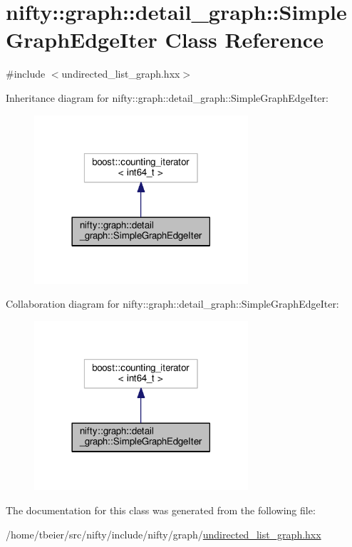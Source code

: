 \hypertarget{classnifty_1_1graph_1_1detail__graph_1_1SimpleGraphEdgeIter}{}\section{nifty\+:\+:graph\+:\+:detail\+\_\+graph\+:\+:Simple\+Graph\+Edge\+Iter Class Reference}
\label{classnifty_1_1graph_1_1detail__graph_1_1SimpleGraphEdgeIter}


{\ttfamily \#include $<$undirected\+\_\+list\+\_\+graph.\+hxx$>$}



Inheritance diagram for nifty\+:\+:graph\+:\+:detail\+\_\+graph\+:\+:Simple\+Graph\+Edge\+Iter\+:\nopagebreak
\begin{figure}[H]
\begin{center}
\leavevmode
\includegraphics[width=225pt]{classnifty_1_1graph_1_1detail__graph_1_1SimpleGraphEdgeIter__inherit__graph}
\end{center}
\end{figure}


Collaboration diagram for nifty\+:\+:graph\+:\+:detail\+\_\+graph\+:\+:Simple\+Graph\+Edge\+Iter\+:\nopagebreak
\begin{figure}[H]
\begin{center}
\leavevmode
\includegraphics[width=225pt]{classnifty_1_1graph_1_1detail__graph_1_1SimpleGraphEdgeIter__coll__graph}
\end{center}
\end{figure}


The documentation for this class was generated from the following file\+:\begin{DoxyCompactItemize}
\item 
/home/tbeier/src/nifty/include/nifty/graph/\hyperlink{graph_2undirected__list__graph_8hxx}{undirected\+\_\+list\+\_\+graph.\+hxx}\end{DoxyCompactItemize}
